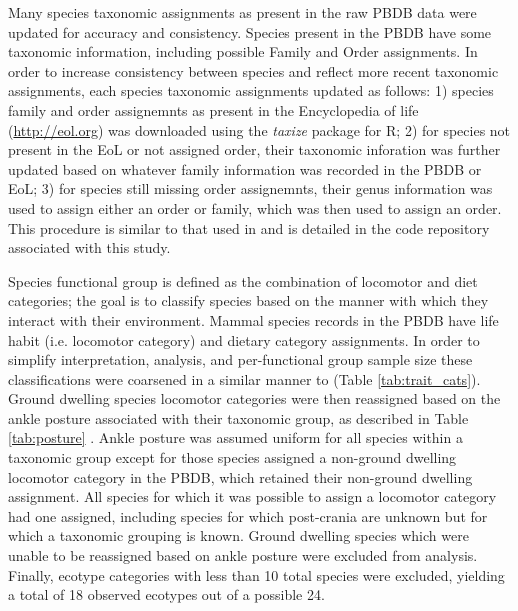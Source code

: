 \documentclass[12pt,letterpaper]{article}
\begin{document}
Many species taxonomic assignments as present in the raw PBDB data were updated for accuracy and consistency. Species present in the PBDB have some taxonomic information, including possible Family and Order assignments. In order to increase consistency between species and reflect more recent taxonomic assignments, each species taxonomic assignments updated as follows: 1) species family and order assignemnts as present in the Encyclopedia of life (\url{http://eol.org}) was downloaded using the \textit{taxize} package for R; 2) for species not present in the EoL or not assigned order, their taxonomic inforation was further updated based on whatever family information was recorded in the PBDB or EoL; 3) for species still missing order assignemnts, their genus information was used to assign either an order or family, which was then used to assign an order. This procedure is similar to that used in \citet{Smits2015b} and is detailed in the code repository associated with this study.
%  


Species functional group is defined as the combination of locomotor and diet categories; the goal is to classify species based on the manner with which they interact with their environment. Mammal species records in the PBDB have life habit (i.e. locomotor category) and dietary category assignments. In order to simplify interpretation, analysis, and per-functional group sample size these classifications were coarsened in a similar manner to \citet{Smits2015b} (Table \ref{tab:trait_cats}). Ground dwelling species locomotor categories were then reassigned based on the ankle posture associated with their taxonomic group, as described in Table \ref{tab:posture} \citep{Carrano1999}. Ankle posture was assumed uniform for all species within a taxonomic group except for those species assigned a non-ground dwelling locomotor category in the PBDB, which retained their non-ground dwelling assignment. All species for which it was possible to assign a locomotor category had one assigned, including species for which post-crania are unknown but for which a taxonomic grouping is known. Ground dwelling species which were unable to be reassigned based on ankle posture were excluded from analysis. Finally, ecotype categories with less than 10 total species were excluded, yielding a total of 18 observed ecotypes out of a possible 24.
\end{document}
